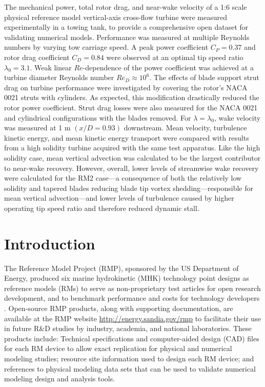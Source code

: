 \documentclass[10pt,letterpaper]{article}
\begin{document}
The mechanical power, total rotor drag, and near-wake velocity of a 1:6 scale
physical reference model vertical-axis cross-flow turbine were measured
experimentally in a towing tank, to provide a comprehensive open dataset for
validating numerical models. Performance was measured at multiple Reynolds
numbers by varying tow carriage speed. A peak power coefficient $C_P = 0.37$ and
rotor drag coefficient $C_D = 0.84$ were observed at an optimal tip speed ratio
$\lambda_0 = 3.1$. Weak linear $Re$-dependence of the power coefficient was
achieved at a turbine diameter Reynolds number $Re_D \approx 10^6$. The effects
of blade support strut drag on turbine performance were investigated by covering
the rotor's NACA 0021 struts with cylinders. As expected, this modification
drastically reduced the rotor power coefficient. Strut drag losses were also
measured for the NACA 0021 and cylindrical configurations with the blades
removed. For $\lambda=\lambda_0$, wake velocity was measured at 1 m $(x/D=0.93)$
downstream. Mean velocity, turbulence kinetic energy, and mean kinetic energy
transport were compared with results from a high solidity turbine acquired with
the same test apparatus. Like the high solidity case, mean vertical advection
was calculated to be the largest contributor to near-wake recovery. However,
overall, lower levels of streamwise wake recovery were calculated for the RM2
case---a consequence of both the relatively low solidity and tapered blades
reducing blade tip vortex shedding---responsible for mean vertical
advection---and lower levels of turbulence caused by higher operating tip speed
ratio and therefore reduced dynamic stall.


\section*{Introduction}

The Reference Model Project (RMP), sponsored by the US Department of Energy,
produced six marine hydrokinetic (MHK) technology point designs as reference
models (RMs) to serve as non-proprietary test articles for open research
development, and to benchmark performance and costs for technology developers
\cite{Neary2014, Neary2014a}. Open-source RMP products, along with supporting
documentation, are available at the RMP website
\url{http://energy.sandia.gov/rmp} to facilitate their use in future R\&D
studies by industry, academia, and national laboratories. These products
include: Technical specifications and computer-aided design (CAD) files for each
RM device to allow exact replication for physical and numerical modeling
studies; resource site information used to design each RM device; and references
to physical modeling data sets that can be used to validate numerical modeling
design and analysis tools.
\end{document}
